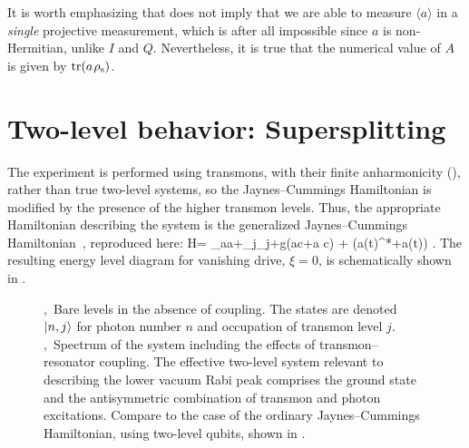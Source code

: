 It is worth emphasizing that  does not imply that we are able to measure $\langle a\rangle$ in a \emph{single} projective measurement, which is after all impossible since $a$ is non-Hermitian, unlike $I$ and $Q$\@. Nevertheless, it is true that the numerical value of $A$ is given by $\operatorname{tr} (a\mspace{1.5mu}\rho_\text{s})$.

\section{Two-level behavior: Supersplitting}
\label{sec:supersplit}
The experiment is performed using transmons, with their finite anharmonicity (), rather than true two-level systems, so the Jaynes--Cummings Hamiltonian is modified by the presence of the higher transmon levels. Thus, the appropriate Hamiltonian describing the system is the generalized Jaynes--Cummings Hamiltonian~, reproduced here:
\be\tag{\ref{eq:genJCrot2}}
    H= \Delta_a\dg a+\sum_j\Delta_j+g\bigl(a\dg c+a c\dg \bigr)
        + \bigl(a\xi(t)^*+a\dg\xi(t)\bigr) .
\ee
The resulting energy level diagram for vanishing drive, $\xi=0$, is schematically shown in .
\begin{figure}
 \centering
 \caption[Extended Jaynes--Cummings level diagram of the resonator--transmon system]{ ,~Bare levels in the absence of coupling. The states are denoted $\left\lvert n,j \right\rangle$ for photon number $n$ and occupation of transmon level $j$.  ,~Spectrum of the system including the effects of transmon--resonator coupling.  The effective two-level system relevant to describing the lower vacuum Rabi peak comprises the ground state and the antisymmetric combination of transmon and photon excitations. Compare to the case of the ordinary Jaynes--Cummings Hamiltonian, using two-level qubits, shown in .\label{fig:extjc}}
 \end{figure}%
